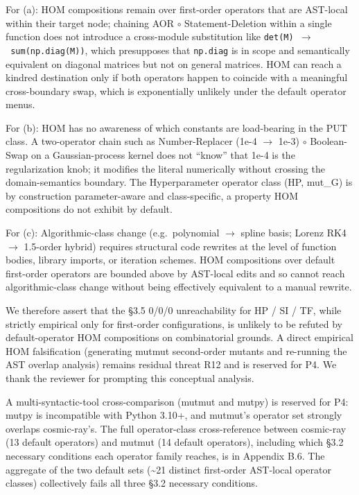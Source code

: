 \documentclass[review,12pt,authoryear]{elsarticle}
\begin{document}
For (a): HOM compositions remain over first-order operators that are
AST-local within their target node; chaining AOR $\circ$ Statement-Deletion
within a single function does not introduce a cross-module substitution
like \texttt{det(M)\ $\to$\ sum(np.diag(M))}, which presupposes that
\texttt{np.diag} is in scope and semantically equivalent on diagonal
matrices but not on general matrices. HOM can reach a kindred
destination only if both operators happen to coincide with a meaningful
cross-boundary swap, which is exponentially unlikely under the default
operator menus.

For (b): HOM has no awareness of which constants are load-bearing in the
PUT class. A two-operator chain such as Number-Replacer (1e-4 $\to$ 1e-3) $\circ$
Boolean-Swap on a Gaussian-process kernel does not ``know'' that 1e-4 is
the regularization knob; it modifies the literal numerically without
crossing the domain-semantics boundary. The Hyperparameter operator
class (HP, mut\_G) is by construction parameter-aware and
class-specific, a property HOM compositions do not exhibit by default.

For (c): Algorithmic-class change (e.g.~polynomial $\to$ spline basis;
Lorenz RK4 $\to$ 1.5-order hybrid) requires structural code rewrites at the
level of function bodies, library imports, or iteration schemes. HOM
compositions over default first-order operators are bounded above by
AST-local edits and so cannot reach algorithmic-class change without
being effectively equivalent to a manual rewrite.

We therefore assert that the §3.5 0/0/0 unreachability for HP / SI / TF,
while strictly empirical only for first-order configurations, is
unlikely to be refuted by default-operator HOM compositions on
combinatorial grounds. A direct empirical HOM falsification (generating
mutmut second-order mutants and re-running the AST overlap analysis)
remains residual threat R12 and is reserved for P4. We thank the
reviewer for prompting this conceptual analysis.

A multi-syntactic-tool cross-comparison (mutmut and mutpy) is reserved
for P4: mutpy is incompatible with Python 3.10+, and mutmut's operator
set strongly overlaps cosmic-ray's. The full operator-class
cross-reference between cosmic-ray (13 default operators) and mutmut (14
default operators), including which §3.2 necessary conditions each
operator family reaches, is in Appendix B.6. The aggregate of the two
default sets (\textasciitilde21 distinct first-order AST-local operator
classes) collectively fails all three §3.2 necessary conditions.
\end{document}
